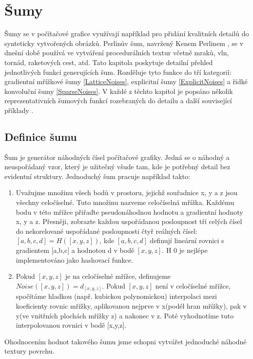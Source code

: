 \section{Šumy}
\label{noise}
Šumy se v počítačové grafice využívají například pro přidání kvalitních detailů do synteticky vytvořených obrázků. Perlinův šum, navržený Kenem Perlinem \cite{PerlinKen}, se v dnešní době používá ve vytváření procedurálních textur včetně mraků, vln, tornád, raketových cest, atd. Tato kapitola poskytuje detailní přehled jednotlivých funkcí generujících šum. Rozděluje tyto funkce do tří kategorií: gradientní mřížkové šumy \ref{LatticeNoises}, explicitní šumy \ref{ExplicitNoises} a řídké konvoluční šumy \ref{SparseNoises}. V každé z těchto kapitol je popsáno několik reprezentativních šumových funkcí rozebraných do detailu a další související příklady \cite{Lagae10}. 

\subsection{Definice šumu}
Šum je generátor náhodných čísel počítačové grafiky. \cite{PerlinKen} Jedná se o náhodný a neuspořádaný vzor, který je užitečný všude tam, kde je potřebný detail bez evidentní struktury. Jednoduchý šum pracuje například takto:
\begin{enumerate}
	\item Uvažujme množinu všech bodů v prostoru, jejichž souřadnice x, y a z jsou všechny celočíselné. Tuto množinu nazveme celočíselná mřížka. Každému bodu v této mřížce přiřaďte pseudonáhodnou hodnotu a gradientní hodnoty x, y a z. Přesněji, zobrazte každou uspořádanou posloupnost tří celých čísel do nekorelované uspořádané posloupnosti čtyř reálných čísel: $[a,b,c,d] = H([x,y,z])$, kde $[a,b,c,d]$ definují lineární rovnici s gradientem [a,b,c] a hodnotou d v bodě $[x,y,z]$. H 0 je nejlépe implementováno jako hashovací funkce.
	\item Pokud $[x,y,z]$ je na celočíselné mřížce, definujeme $Noise([x,y,z]) = d_{[x,y,z]}$. Pokud $[x,y,z]$ není v celočíselné mřížce, spočítáme hladkou (např. kubickou polynomickou) interpolaci mezi koeficienty rovnic mřížky, aplikovanou nejprve v x(podél hran mřížky), pak v y(ve vnitřních plochách mřížky z) a nakonec v z. Poté vyhodnotíme tuto interpolovanou rovnici v bodě [x,y,z]. 
\end{enumerate}

Ohodnocením hodnot takového šumu jsme schopni vytvářet jednoduché náhodné textury povrchu. \cite{PerlinKen} 

